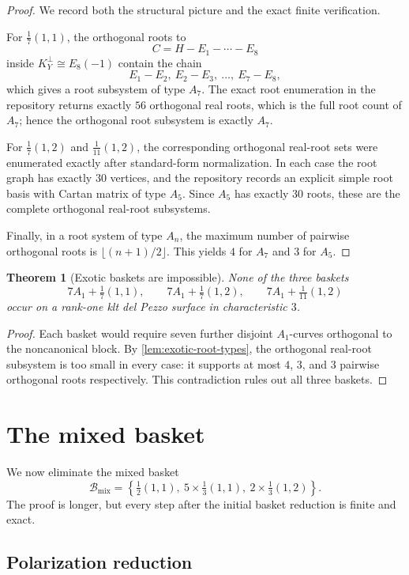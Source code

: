 \documentclass[11pt]{article}
\newtheorem{theorem}{Theorem}[section]
\theoremstyle{definition}
\begin{document}
\begin{proof}
We record both the structural picture and the exact finite verification.

For $\frac17(1,1)$, the orthogonal roots to
\[
C=H-E_1-\cdots-E_8
\]
inside $K_Y^{\perp}\cong E_8(-1)$ contain the chain
\[
E_1-E_2,\ E_2-E_3,\ \dots,\ E_7-E_8,
\]
which gives a root subsystem of type $A_7$. The exact root enumeration in the repository returns exactly $56$ orthogonal real roots, which is the full root count of $A_7$; hence the orthogonal root subsystem is exactly $A_7$.

For $\frac17(1,2)$ and $\frac1{11}(1,2)$, the corresponding orthogonal real-root sets were enumerated exactly after standard-form normalization. In each case the root graph has exactly $30$ vertices, and the repository records an explicit simple root basis with Cartan matrix of type $A_5$. Since $A_5$ has exactly $30$ roots, these are the complete orthogonal real-root subsystems.

Finally, in a root system of type $A_n$, the maximum number of pairwise orthogonal roots is $\lfloor (n+1)/2\rfloor$. This yields $4$ for $A_7$ and $3$ for $A_5$.
\end{proof}

\begin{theorem}[Exotic baskets are impossible]\label{thm:exotic}
None of the three baskets
\[
7A_1+\tfrac17(1,1),\qquad 7A_1+\tfrac17(1,2),\qquad 7A_1+\tfrac1{11}(1,2)
\]
occur on a rank-one klt del Pezzo surface in characteristic $3$.
\end{theorem}

\begin{proof}
Each basket would require seven further disjoint $A_1$-curves orthogonal to the noncanonical block. By \cref{lem:exotic-root-types}, the orthogonal real-root subsystem is too small in every case: it supports at most $4$, $3$, and $3$ pairwise orthogonal roots respectively. This contradiction rules out all three baskets.
\end{proof}

\section{The mixed basket}\label{sec:mixed}
We now eliminate the mixed basket
\[
\mathcal B_{\mathrm{mix}}=\left\{\tfrac12(1,1),\ 5\times\tfrac13(1,1),\ 2\times\tfrac13(1,2)\right\}.
\]
The proof is longer, but every step after the initial basket reduction is finite and exact.

\subsection{Polarization reduction}
\end{document}
